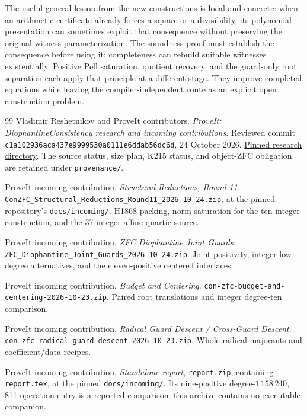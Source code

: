 \documentclass[11pt,a4paper]{article}
\newcommand{\file}[1]{\nolinkurl{#1}}
\theoremstyle{definition}
\theoremstyle{remark}
\numberwithin{equation}{section}
\begin{document}
The useful general lesson from the new constructions is local and concrete:
when an arithmetic certificate already forces a square or a divisibility,
its polynomial presentation can sometimes exploit that consequence
without preserving the original witness parameterization. The soundness
proof must establish the consequence before using it; completeness can
rebuild suitable witnesses existentially. Positive Pell saturation,
quotient recovery, and the guard-only root separation each apply that
principle at a different stage. They improve completed equations while
leaving the compiler-independent route as an explicit open construction
problem.

\begin{thebibliography}{99}
Vladimir Reshetnikov and ProveIt contributors.
\emph{ProveIt: DiophantineConsistency research and incoming contributions}.
Reviewed commit
\texttt{c1a102936aca437e9999\allowbreak530a0111e6ddab56dc6d},
24 October 2026.
\href{https://github.com/VladimirReshetnikov/ProveIt/tree/c1a102936aca437e9999530a0111e6ddab56dc6d/Computability/DiophantineConsistency}{Pinned research directory}.
The source status, size plan, K215 status, and object-ZFC obligation are
retained under \file{provenance/}.

ProveIt incoming contribution.
\emph{Structural Reductions, Round 11}.
\file{ConZFC_Structural_Reductions_Round11_2026-10-24.zip},
at the pinned repository's \file{docs/incoming/}.
H1868 packing, norm saturation for the ten-integer construction, and
the 37-integer affine quartic source.

ProveIt incoming contribution.
\emph{ZFC Diophantine Joint Guards}.
\file{ZFC_Diophantine_Joint_Guards_2026-10-24.zip}.
Joint positivity, integer low-degree alternatives, and the
eleven-positive centered interfaces.

ProveIt incoming contribution.
\emph{Budget and Centering}.
\file{con-zfc-budget-and-centering-2026-10-23.zip}.
Paired root translations and integer degree-ten comparison.

ProveIt incoming contribution.
\emph{Radical Guard Descent / Cross-Guard Descent}.
\file{con-zfc-radical-guard-descent-2026-10-23.zip}.
Whole-radical majorants and coefficient/data recipes.

ProveIt incoming contribution.
\emph{Standalone report}, \file{report.zip}, containing \file{report.tex},
at the pinned \file{docs/incoming/}.
Its nine-positive degree-\(1\,158\,240\), 811-operation entry is a reported
comparison; this archive contains no executable companion.


\end{thebibliography}
\end{document}
